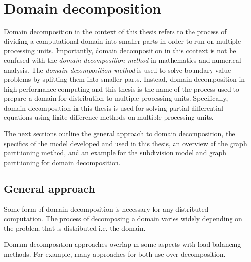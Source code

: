 \section{Domain decomposition}
% 
% 
Domain decomposition in the context of this thesis refers to the process of dividing a computational domain into smaller parts in order to run on multiple processing units.
Importantly, domain decomposition in this context is not be confused with the \textit{domain decomposition method} in mathematics and numerical analysis.
The \textit{domain decomposition method} is used to solve boundary value problems by splitting them into smaller parts.
Instead, domain decomposition in high performance computing and this thesis is the name of the process used to prepare a domain for distribution to multiple processing units.
Specifically, domain decomposition in this thesis is used for solving partial differential equations using finite difference methods on multiple processing units.

The next sections outline the general approach to domain decomposition, the specifics of the model developed and used in this thesis, an overview of the graph partitioning method, and an example for the subdivision model and graph partitioning for domain decomposition.

\subsection{General approach}
Some form of domain decomposition is necessary for any distributed computation.
The process of decomposing a domain varies widely depending on the problem that is distributed i.e. the domain.

Domain decomposition approaches overlap in some aspects with load balancing methods.
For example, many approaches for both use over-decomposition.

